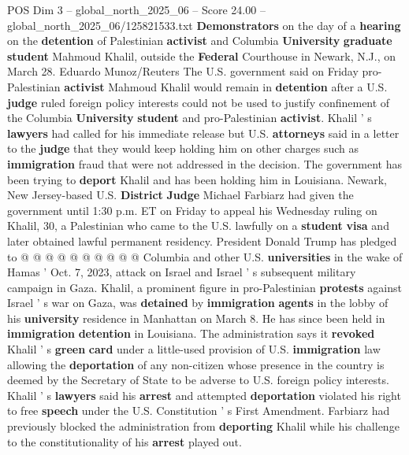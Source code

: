 \begin{textsample}{POS Dim 3 – global\_north\_2025\_06 – Score 24.00 – global\_north\_2025\_06/125821533.txt}  \label{ex:f3_pos_099}
\textbf{Demonstrators} on the day of a \textbf{hearing} on the \textbf{detention} of Palestinian \textbf{activist} and Columbia \textbf{University} \textbf{graduate} \textbf{student} Mahmoud Khalil, outside the \textbf{Federal} Courthouse in Newark, N.J., on March 28.
Eduardo Munoz/Reuters The U.S. government said on Friday pro-Palestinian \textbf{activist} Mahmoud Khalil would remain in \textbf{detention} after a U.S. \textbf{judge} ruled foreign policy interests could not be used to justify confinement of the Columbia \textbf{University} \textbf{student} and pro-Palestinian \textbf{activist}.
Khalil ' s \textbf{lawyers} had called for his immediate release but U.S. \textbf{attorneys} said in a letter to the \textbf{judge} that they would keep holding him on other charges such as \textbf{immigration} fraud that were not addressed in the decision.
The government has been trying to \textbf{deport} Khalil and has been holding him in Louisiana.
Newark, New Jersey-based U.S. \textbf{District} \textbf{Judge} Michael Farbiarz had given the government until 1:30 p.m.
ET on Friday to appeal his Wednesday ruling on Khalil, 30, a Palestinian who came to the U.S. lawfully on a \textbf{student} \textbf{visa} and later obtained lawful permanent residency.
President Donald Trump has pledged to @ @ @ @ @ @ @ @ @ @ Columbia and other U.S. \textbf{universities} in the wake of Hamas ' Oct. 7, 2023, attack on Israel and Israel ' s subsequent military campaign in Gaza.
Khalil, a prominent figure in pro-Palestinian \textbf{protests} against Israel ' s war on Gaza, was \textbf{detained} by \textbf{immigration} \textbf{agents} in the lobby of his \textbf{university} residence in Manhattan on March 8.
He has since been held in \textbf{immigration} \textbf{detention} in Louisiana.
The administration says it \textbf{revoked} Khalil ' s \textbf{green} \textbf{card} under a little-used provision of U.S. \textbf{immigration} law allowing the \textbf{deportation} of any non-citizen whose presence in the country is deemed by the Secretary of State to be adverse to U.S. foreign policy interests.
Khalil ' s \textbf{lawyers} said his \textbf{arrest} and attempted \textbf{deportation} violated his right to free \textbf{speech} under the U.S.
Constitution ' s First Amendment.
Farbiarz had previously blocked the administration from \textbf{deporting} Khalil while his challenge to the constitutionality of his \textbf{arrest} played out.

\end{textsample}
